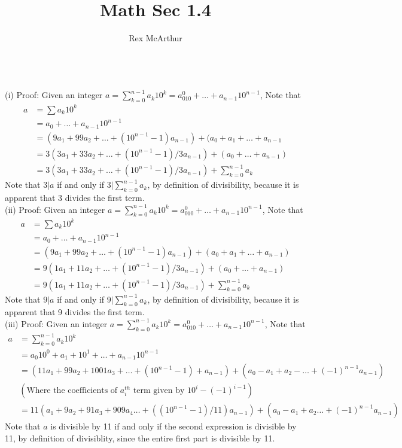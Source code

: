 \documentclass[letterpaper,12pt]{article}
\title{Math Sec 1.4}
\author{Rex McArthur}
\theoremstyle{definition}
\begin{document}
\maketitle
{}\\
(i)
Proof: Given an integer $a = \sum^{n-1}_{k=0} a_k10^k = a_010^0+\dots+
    a_{n-1}10^{n-1}$, Note that\\
        \begin{align*}
            a &= \sum{a_k10^k}\\
            & = a_0+\dots+a_{n-1}10^{n-1}\\
            & = (9a_1 + 99a_2 + \dots +(10^{n-1}-1)a_{n-1}) + (a_0 + a_1 + \dots
                + a_{n-1}\\
            & = 3(3a_1 + 33 a_2 + \dots +  (10^{n-1} -1)/3 a_{n-1}) + 
            (a_0+\dots+a_{n-1})\\
            & = 3(3a_1 + 33 a_2 + \dots +  (10^{n-1} -1)/3 a_{n-1}) + 
            \sum^{n-1}_{k=0} a_k
        \end{align*}
    Note that $3|a$ if and only if $3|\sum^{n-1}_{k=0} a_k$, by definition of 
    divisibility, because it is apparent that 3 divides the first term.\\
(ii)
Proof: Given an integer $a = \sum^{n-1}_{k=0} a_k10^k = a_010^0+\dots+
    a_{n-1}10^{n-1}$, Note that\\
        \begin{align*}
            a &= \sum{a_k10^k}\\
            & = a_0+\dots+a_{n-1}10^{n-1}\\
            & = (9a_1 + 99a_2 + \dots +(10^{n-1}-1)a_{n-1}) + (a_0 + a_1 + \dots
                + a_{n-1})\\
            & = 9(1a_1 + 11 a_2 + \dots +  (10^{n-1} -1)/3 a_{n-1}) + 
            (a_0+\dots+a_{n-1})\\
            & = 9(1a_1 + 11 a_2 + \dots +  (10^{n-1} -1)/3 a_{n-1}) + 
            \sum^{n-1}_{k=0} a_k
        \end{align*}
    Note that $9|a$ if and only if $9|\sum^{n-1}_{k=0} a_k$, by definition of 
    divisibility, because it is apparent that 9 divides the first term.\\
(iii)
Proof: Given an integer $a = \sum^{n-1}_{k=0} a_k10^k = a_010^0+\dots+
    a_{n-1}10^{n-1}$, Note that\\
\begin{align*}
    a &= \sum^{n-1}_{k = 0} a_k 10^k \\
    & = a_0 10^0 + a_1 + 10^1 + \dots + a_{n-1} 10^{n-1}\\
    & = (11a_1 + 99a_2 + 1001a_3 + \dots + (10^{n-1}-1)+a_{n-1}) + (a_0 - a_1 + 
        a_2 - \dots + (-1)^{n-1} a_{n-1})\\
   &(\text{Where the coefficients of $a_i^{th}$ term given by $10^{i}-(-1)^{i-1}$})\\
   & = 11(a_1 + 9a_2+91a_3+909a_4\dots+( (10^{n-1}-1)/11)a_{n-1})+(a_0-a_1+a_2\dots
        +(-1)^{n-1}a_{n-1})
\end{align*}
Note that $a$ is divisible by 11 if and only if the second expression is divisible
by 11, by definition of divisiblity, since the entire first part is divisible by 11.
\end{document}
